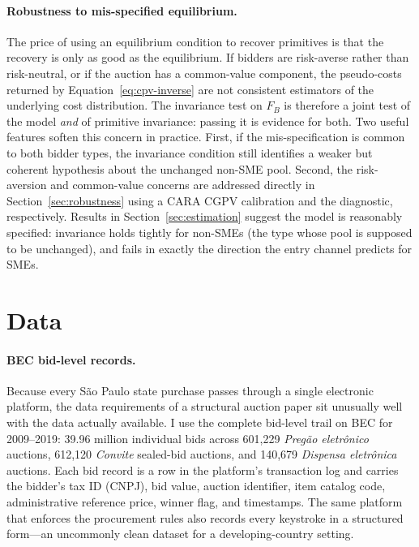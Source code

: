 \documentclass[12pt]{article}
\begin{document}
\paragraph{Robustness to mis-specified equilibrium.}
The price of using an equilibrium condition to recover primitives
is that the recovery is only as good as the equilibrium. If
bidders are risk-averse rather than risk-neutral, or if the
auction has a common-value component, the pseudo-costs returned
by Equation~\eqref{eq:cpv-inverse} are not consistent estimators
of the underlying cost distribution. The invariance test on
$F_B$ is therefore a joint test of the model \emph{and} of
primitive invariance: passing it is evidence for both. Two useful
features soften this concern in practice. First, if the
mis-specification is common to both bidder types, the invariance
condition still identifies a weaker but coherent hypothesis about
the unchanged non-SME pool. Second, the risk-aversion and
common-value concerns are addressed directly in
Section~\ref{sec:robustness} using a CARA CGPV calibration and
the \citet{hendricks2003} diagnostic, respectively. Results in
Section~\ref{sec:estimation} suggest the model is reasonably
specified: invariance holds tightly for non-SMEs (the type whose
pool is supposed to be unchanged), and fails in exactly the
direction the entry channel predicts for SMEs.

\section{Data}
\label{sec:data}

\paragraph{BEC bid-level records.}
Because every São Paulo state purchase passes through a single
electronic platform, the data requirements of a structural auction
paper sit unusually well with the data actually available. I use
the complete bid-level trail on BEC for 2009--2019: 39.96 million
individual bids across 601{,}229 \emph{Preg\~ao eletr\^onico}
auctions, 612{,}120 \emph{Convite} sealed-bid auctions, and
140{,}679 \emph{Dispensa eletr\^onica} auctions. Each bid record
is a row in the platform's transaction log and carries the
bidder's tax ID (CNPJ), bid value, auction identifier, item
catalog code, administrative reference price, winner flag, and
timestamps. The same platform that enforces the procurement rules
also records every keystroke in a structured form---an
uncommonly clean dataset for a developing-country setting.
\end{document}
